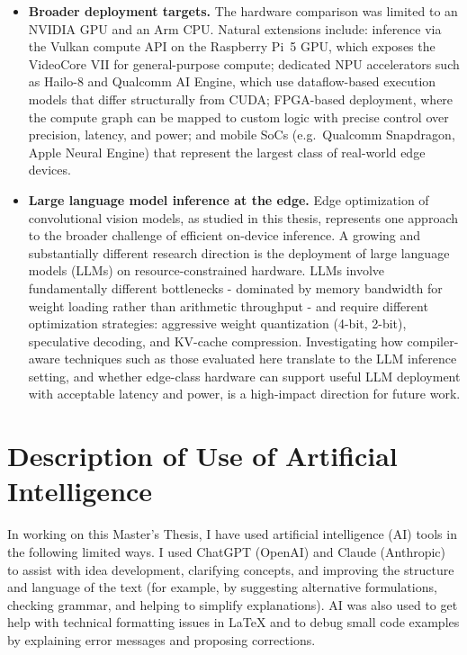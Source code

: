 \documentclass[12pt,a4paper]{report}
\begin{document}
\begin{itemize}
\item \textbf{Broader deployment targets.}
The hardware comparison was limited to an NVIDIA GPU and an Arm CPU.
Natural extensions include: inference via the Vulkan compute API on the Raspberry Pi~5 GPU, which exposes the VideoCore
VII for general-purpose compute; dedicated NPU accelerators such as Hailo-8 and Qualcomm AI Engine, which use
dataflow-based execution models that differ structurally from CUDA; FPGA-based deployment, where the compute graph can
be mapped to custom logic with precise control over precision, latency, and power; and mobile SoCs (e.g.\ Qualcomm
Snapdragon, Apple Neural Engine) that represent the largest class of real-world edge devices.

\item \textbf{Large language model inference at the edge.}
Edge optimization of convolutional vision models, as studied in this thesis, represents one approach to the broader
challenge of efficient on-device inference.
A growing and substantially different research direction is the deployment of large language models (LLMs) on
resource-constrained hardware.
LLMs involve fundamentally different bottlenecks - dominated by memory bandwidth for weight loading rather than
arithmetic throughput - and require different optimization strategies: aggressive weight quantization (4-bit, 2-bit),
speculative decoding, and KV-cache compression.
Investigating how compiler-aware techniques such as those evaluated here translate to the LLM inference setting, and
whether edge-class hardware can support useful LLM deployment with acceptable latency and power, is a high-impact
direction for future work.

\end{itemize}


\chapter{Description of Use of Artificial Intelligence}

    In working on this Master's Thesis, I have used
    artificial intelligence (AI) tools in the following limited
    ways. I used ChatGPT (OpenAI) and Claude (Anthropic) to assist with idea development,
    clarifying concepts, and improving the structure and language of the text (for example,
    by suggesting alternative formulations, checking grammar, and helping to simplify explanations).
    AI was also used to get help with technical formatting issues in \LaTeX{} and to debug small
    code examples by explaining error messages and proposing corrections.
\end{document}
